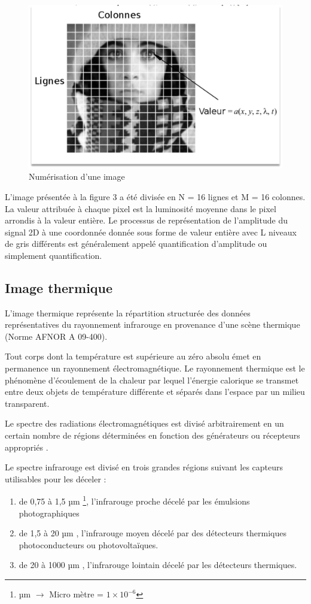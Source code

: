 \documentclass[12pt]{article}
\begin{document}
\newpage
\begin{figure}[h]
\centering
\includegraphics[width=15cm]{img-Chapiter-1/nor.png}
\caption{Numérisation d'une image}
\end{figure}

L'image présentée à la figure 3 a été divisée en N = 16 lignes et M = 16 colonnes. La valeur attribuée à chaque pixel est la luminosité moyenne dans le pixel arrondis à la valeur entière. Le processus de représentation de l'amplitude du signal 2D à une coordonnée donnée sous forme de valeur entière avec L niveaux de gris différents est généralement appelé quantification d'amplitude ou simplement quantification.
\subsection{Image thermique}
L'image thermique représente la répartition structurée des données représentatives du rayonnement infrarouge en provenance d'une scène thermique (Norme AFNOR A 09-400).

Tout corps dont la température est supérieure au zéro absolu émet en permanence un rayonnement électromagnétique. Le rayonnement thermique est le phénomène d'écoulement de la chaleur par lequel l'énergie calorique se transmet entre deux objets de température différente et séparés dans l'espace par un milieu transparent.

Le spectre des radiations électromagnétiques est divisé arbitrairement en un certain nombre de régions déterminées en fonction des générateurs ou récepteurs appropriés \cite{40}.

Le spectre infrarouge est divisé en trois grandes régions suivant les capteurs utilisables pour les déceler \cite{41}:
\begin{enumerate}
	\item de 0,75 à 1,5 µm \footnote{µm $\longrightarrow$ Micro mètre  = $1 \times 10^{-6}$}, l'infrarouge proche décelé par les émulsions photographiques
	\item de 1,5 à 20 µm , l'infrarouge moyen décelé par des détecteurs thermiques photoconducteurs ou photovoltaïques.
	\item de 20 à 1000 µm , l'infrarouge lointain décelé par les détecteurs thermiques.
\end{enumerate}
\end{document}

